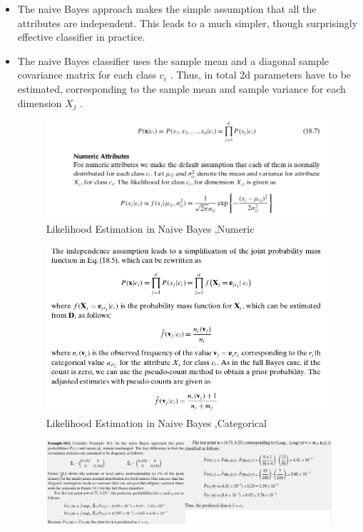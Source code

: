 \begin{itemize}
 \item The naive Bayes approach makes the simple assumption that all the attributes are independent. This leads to a much simpler, though surprisingly effective classifier in practice.
 \item The naive Bayes classifier uses the sample mean and a diagonal sample covariance matrix for each class $c_i$ . Thus, in total 2d parameters have to be estimated, corresponding to the sample mean and sample variance for each dimension $X_j$ .
\begin{figure}[H]
\centerline{\includegraphics[width=1.2\textwidth]{Figures/naive}}
\caption{\label{fig:figure21}Likelihood Estimation in Naive Bayes ,Numeric}
\end{figure}
\begin{figure}[H]
\centerline{\includegraphics[width=1.1\textwidth]{Figures/naive2}}
\caption{\label{fig:figure22}Likelihood Estimation in Naive Bayes ,Categorical}
\end{figure}
\begin{figure}[H]
\centerline{\includegraphics[width=1.7\textwidth]{Figures/bayes4}}
\end{figure}
\end{itemize}